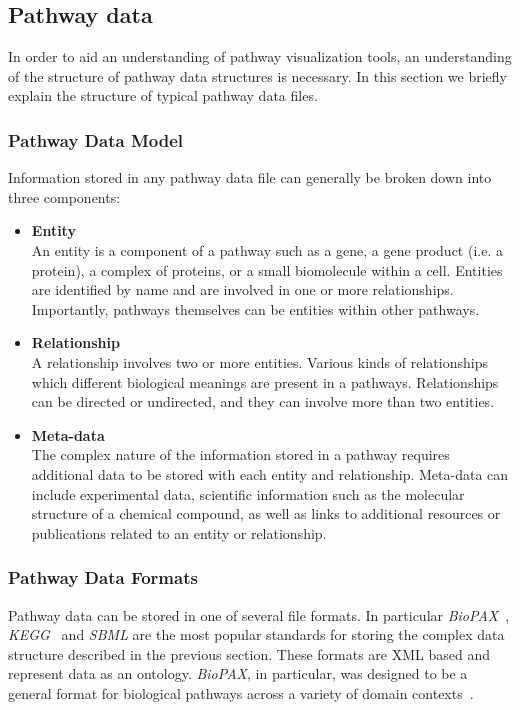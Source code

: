\documentclass[review,journal]{vgtc}         %
\begin{document}
\subsection{Pathway data}

In order to aid an understanding of pathway visualization tools, an understanding of the structure of pathway data structures is necessary. In this section we briefly explain the structure of typical pathway data files. 

\subsubsection{Pathway Data Model}

Information stored in any pathway data file can generally be broken down into three components:

\begin{itemize}

\item \textbf{Entity}\\
An entity is a component of a pathway such as a gene, a gene product (i.e. a protein), a complex of proteins, or a small biomolecule within a cell. Entities are identified by name and are involved in one or more relationships. Importantly, pathways themselves can be entities within other pathways.
\item \textbf{Relationship}\\
A relationship involves two or more entities. Various kinds of relationships which different biological meanings are present in a pathways. Relationships can be directed or undirected, and they can involve more than two entities.
\item \textbf{Meta-data}\\
The complex nature of the information stored in a pathway requires additional data to be stored with each entity and relationship. Meta-data can include experimental data, scientific information such as the molecular structure of a chemical compound, as well as links to additional resources or publications related to an entity or relationship.

\end{itemize}


\subsubsection{Pathway Data Formats}

Pathway data can be stored in one of several file formats. In particular \textit{BioPAX}~\cite{demir2010biopax}, \textit{KEGG}~\cite{kanehisa2000kegg} and \textit{SBML} are the most popular standards for storing the complex data structure described in the previous section. These formats are XML based and represent data as an ontology. \emph{BioPAX}, in particular, was designed to be a general format for biological pathways across a variety of domain contexts~\cite{demir2010biopax}.
\end{document}
